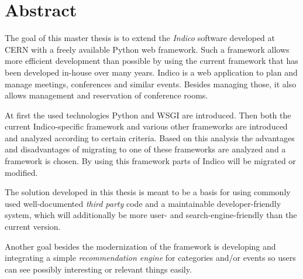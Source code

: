 \chapter*{Abstract}
\thispagestyle{empty}

The goal of this master thesis is to extend the \emph{Indico} software developed at CERN with a
freely available Python web framework. Such a framework allows more efficient development than
possible by using the current framework that has been developed in-house over many years.
Indico is a web application to plan and manage meetings, conferences and similar events. Besides
managing those, it also allows management and reservation of conference rooms.

At first the used technologies Python and WSGI are introduced. Then both the current
Indico-specific framework and various other frameworks are introduced and analyzed according to
certain criteria. Based on this analysis the advantages and disadvantages of migrating to one of
these frameworks are analyzed and a framework is chosen. By using this framework parts of Indico
will be migrated or modified.

The solution developed in this thesis is meant to be a basis for using commonly used well-documented
\emph{third party} code and a maintainable developer-friendly system, which will additionally be
more user- and search-engine-friendly than the current version.

Another goal besides the modernization of the framework is developing and integrating a simple
\emph{recommendation engine} for categories and/or events so users can see possibly interesting or
relevant things easily.
